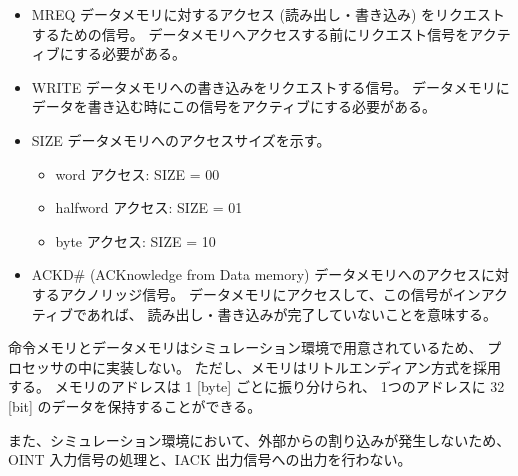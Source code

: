 \documentclass[../specifications.tex]{subfiles}
\begin{document}
\begin{itemize}
    \item MREQ
    \newline データメモリに対するアクセス (読み出し・書き込み) をリクエストするための信号。
    データメモリへアクセスする前にリクエスト信号をアクティブにする必要がある。

    \item WRITE
    \newline データメモリへの書き込みをリクエストする信号。
    データメモリにデータを書き込む時にこの信号をアクティブにする必要がある。

    \item SIZE
    \newline データメモリへのアクセスサイズを示す。
    \begin{itemize}
      \item word アクセス: SIZE = 00
      \item halfword アクセス: SIZE = 01
      \item byte アクセス: SIZE = 10
    \end{itemize}

    \item ACKD\# (ACKnowledge from Data memory)
    \newline データメモリへのアクセスに対するアクノリッジ信号。
    データメモリにアクセスして、この信号がインアクティブであれば、
    読み出し・書き込みが完了していないことを意味する。

  \end{itemize}

  命令メモリとデータメモリはシミュレーション環境で用意されているため、
  プロセッサの中に実装しない。
  ただし、メモリはリトルエンディアン方式を採用する。
  メモリのアドレスは 1 [byte] ごとに振り分けられ、
  1つのアドレスに 32 [bit] のデータを保持することができる。

  また、シミュレーション環境において、外部からの割り込みが発生しないため、
  OINT 入力信号の処理と、IACK 出力信号への出力を行わない。
\end{document}
